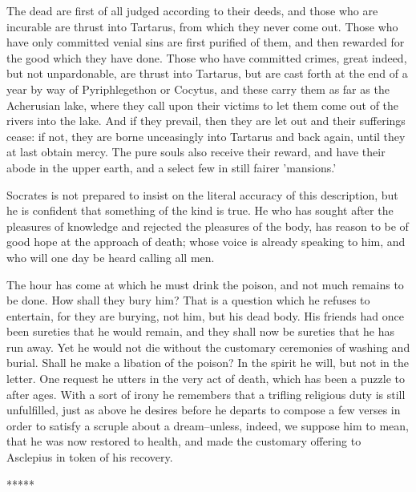 The dead are first of all judged according to their deeds, and those who
are incurable are thrust into Tartarus, from which they never come out.
Those who have only committed venial sins are first purified of them,
and then rewarded for the good which they have done. Those who have
committed crimes, great indeed, but not unpardonable, are thrust
into Tartarus, but are cast forth at the end of a year by way of
Pyriphlegethon or Cocytus, and these carry them as far as the Acherusian
lake, where they call upon their victims to let them come out of the
rivers into the lake. And if they prevail, then they are let out and
their sufferings cease: if not, they are borne unceasingly into Tartarus
and back again, until they at last obtain mercy. The pure souls also
receive their reward, and have their abode in the upper earth, and a
select few in still fairer 'mansions.'

Socrates is not prepared to insist on the literal accuracy of this
description, but he is confident that something of the kind is true.
He who has sought after the pleasures of knowledge and rejected the
pleasures of the body, has reason to be of good hope at the approach of
death; whose voice is already speaking to him, and who will one day be
heard calling all men.

The hour has come at which he must drink the poison, and not much
remains to be done. How shall they bury him? That is a question which he
refuses to entertain, for they are burying, not him, but his dead body.
His friends had once been sureties that he would remain, and they shall
now be sureties that he has run away. Yet he would not die without the
customary ceremonies of washing and burial. Shall he make a libation of
the poison? In the spirit he will, but not in the letter. One request he
utters in the very act of death, which has been a puzzle to after ages.
With a sort of irony he remembers that a trifling religious duty is
still unfulfilled, just as above he desires before he departs to compose
a few verses in order to satisfy a scruple about a dream--unless,
indeed, we suppose him to mean, that he was now restored to health, and
made the customary offering to Asclepius in token of his recovery.

*****

